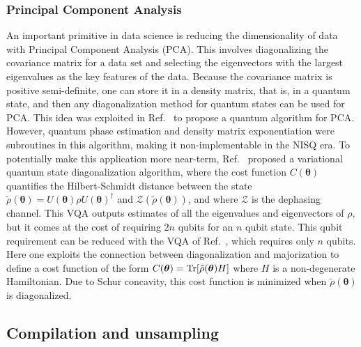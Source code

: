 \documentclass[prx,twocolumn,floatfix,superscriptaddress,longbibliography]{revtex4-1}
\renewcommand{\vec}[1]{\boldsymbol{#1}}  %
\newcommand{\<}{\langle}
\renewcommand{\>}{\rangle}
\newcommand{\Tr}{{\rm Tr}}
\renewcommand{\vec}[1]{\boldsymbol{#1}}  %
\newcommand{\ad}{^\dagger}
\begin{document}
\subsubsection{ Principal Component Analysis} An important primitive in data science is reducing the dimensionality of data with Principal Component Analysis (PCA). This involves diagonalizing the covariance matrix for a data set and selecting the eigenvectors with the largest eigenvalues as the key features of the data. Because the covariance matrix is positive semi-definite, one can store it in a density matrix, that is, in a quantum state, and then any diagonalization method for quantum states can be used for PCA. This idea was  exploited in Ref.~\cite{Lloyd2014} to propose a quantum algorithm for PCA. However,  quantum phase estimation and density matrix exponentiation were subroutines in this algorithm, making it non-implementable in the NISQ era. To potentially make this application more near-term, Ref.~\cite{larose2019variational} proposed a variational quantum state diagonalization algorithm, where the cost function $C(\vec{\theta})$ quantifies the Hilbert-Schmidt distance between the state $\tilde{\rho}(\vec{\theta})=U(\vec{\theta})\rho U(\vec{\theta})\ad$ and $\mathcal{Z}(\tilde{\rho}(\vec{\theta}))$, and where $\mathcal{Z}$ is the dephasing channel. This VQA outputs estimates of all the eigenvalues and eigenvectors of $\rho$, but it comes at the cost of requiring $2n$ qubits for an $n$ qubit state. This qubit requirement can be reduced with the VQA of Ref.~\cite{cerezo2020variational}, which requires only $n$ qubits. Here one exploits the connection between diagonalization and majorization to define a cost function of the form $C(\vec{\theta}) = \Tr[\tilde{\rho}(\vec{\theta}) H]$ where $H$ is a non-degenerate Hamiltonian. Due to Schur concavity, this cost function is minimized when $\tilde{\rho}(\vec{\theta})$ is diagonalized. 


\subsection{ Compilation and unsampling}\label{sec:compilation}
\end{document}
